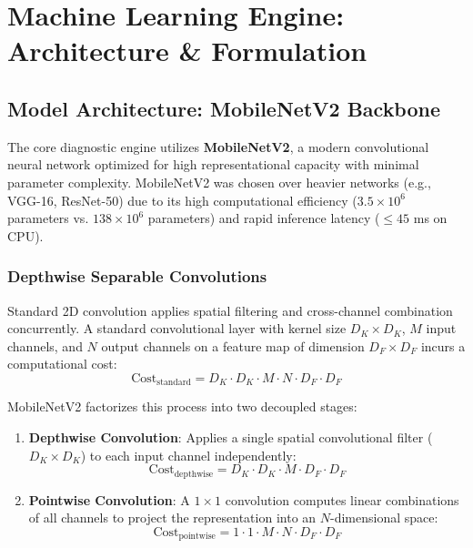 \documentclass[12pt,a4paper]{report}
\begin{document}
\newpage
\chapter{Machine Learning Engine: Architecture \& Formulation}

\section{Model Architecture: MobileNetV2 Backbone}
The core diagnostic engine utilizes \textbf{MobileNetV2}, a modern convolutional neural network optimized for high representational capacity with minimal parameter complexity. MobileNetV2 was chosen over heavier networks (e.g., VGG-16, ResNet-50) due to its high computational efficiency ($3.5\times 10^6$ parameters vs. $138\times 10^6$ parameters) and rapid inference latency ($\le 45$ ms on CPU).

\subsection{Depthwise Separable Convolutions}
Standard 2D convolution applies spatial filtering and cross-channel combination concurrently. A standard convolutional layer with kernel size $D_K \times D_K$, $M$ input channels, and $N$ output channels on a feature map of dimension $D_F \times D_F$ incurs a computational cost:
\begin{equation}
    \text{Cost}_{\text{standard}} = D_K \cdot D_K \cdot M \cdot N \cdot D_F \cdot D_F
\end{equation}

MobileNetV2 factorizes this process into two decoupled stages:
\begin{enumerate}
    \item \textbf{Depthwise Convolution}: Applies a single spatial convolutional filter ($D_K \times D_K$) to each input channel independently:
    \begin{equation}
        \text{Cost}_{\text{depthwise}} = D_K \cdot D_K \cdot M \cdot D_F \cdot D_F
    \end{equation}
    \item \textbf{Pointwise Convolution}: A $1 \times 1$ convolution computes linear combinations of all channels to project the representation into an $N$-dimensional space:
    \begin{equation}
        \text{Cost}_{\text{pointwise}} = 1 \cdot 1 \cdot M \cdot N \cdot D_F \cdot D_F
    \end{equation}
\end{enumerate}
\end{document}
